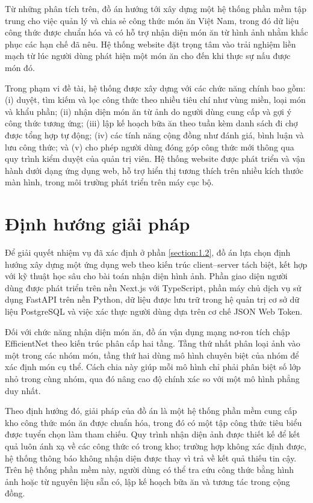 \documentclass[../DoAn.tex]{subfiles}
\begin{document}
Từ những phân tích trên, đồ án hướng tới xây dựng một hệ thống phần mềm tập trung cho việc quản lý và chia sẻ công thức món ăn Việt Nam, trong đó dữ liệu công thức được chuẩn hóa và có hỗ trợ nhận diện món ăn từ hình ảnh nhằm khắc phục các hạn chế đã nêu. Hệ thống website đặt trọng tâm vào trải nghiệm liền mạch từ lúc người dùng phát hiện một món ăn cho đến khi thực sự nấu được món đó.

Trong phạm vi đề tài, hệ thống được xây dựng với các chức năng chính bao gồm: (i) duyệt, tìm kiếm và lọc công thức theo nhiều tiêu chí như vùng miền, loại món và khẩu phần; (ii) nhận diện món ăn từ ảnh do người dùng cung cấp và gợi ý công thức tương ứng; (iii) lập kế hoạch bữa ăn theo tuần kèm danh sách đi chợ được tổng hợp tự động; (iv) các tính năng cộng đồng như đánh giá, bình luận và lưu công thức; và (v) cho phép người dùng đóng góp công thức mới thông qua quy trình kiểm duyệt của quản trị viên. Hệ thống website được phát triển và vận hành dưới dạng ứng dụng web, hỗ trợ hiển thị tương thích trên nhiều kích thước màn hình, trong môi trường phát triển trên máy cục bộ.

\section{Định hướng giải pháp}
\label{section:1.3}
Để giải quyết nhiệm vụ đã xác định ở phần \ref{section:1.2}, đồ án lựa chọn định hướng xây dựng một ứng dụng web theo kiến trúc client--server tách biệt, kết hợp với kỹ thuật học sâu cho bài toán nhận diện hình ảnh. Phần giao diện người dùng được phát triển trên nền Next.js với TypeScript, phần máy chủ dịch vụ sử dụng FastAPI trên nền Python, dữ liệu được lưu trữ trong hệ quản trị cơ sở dữ liệu PostgreSQL và việc xác thực người dùng dựa trên cơ chế JSON Web Token.

Đối với chức năng nhận diện món ăn, đồ án vận dụng mạng nơ-ron tích chập EfficientNet theo kiến trúc phân cấp hai tầng. Tầng thứ nhất phân loại ảnh vào một trong các nhóm món, tầng thứ hai dùng mô hình chuyên biệt của nhóm để xác định món cụ thể. Cách chia này giúp mỗi mô hình chỉ phải phân biệt số lớp nhỏ trong cùng nhóm, qua đó nâng cao độ chính xác so với một mô hình phẳng duy nhất.

Theo định hướng đó, giải pháp của đồ án là một hệ thống phần mềm cung cấp kho công thức món ăn được chuẩn hóa, trong đó có một tập công thức tiêu biểu được tuyển chọn làm tham chiếu. Quy trình nhận diện ảnh được thiết kế để kết quả luôn ánh xạ về các công thức có trong kho; trường hợp không xác định được, hệ thống thông báo không nhận diện được thay vì trả về kết quả thiếu tin cậy. Trên hệ thống phần mềm này, người dùng có thể tra cứu công thức bằng hình ảnh hoặc từ nguyên liệu sẵn có, lập kế hoạch bữa ăn và tương tác trong cộng đồng.
\end{document}
